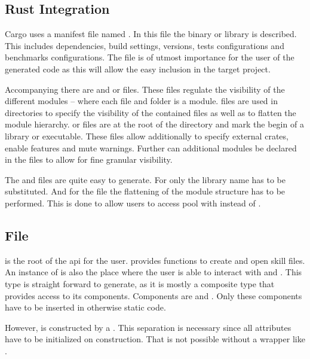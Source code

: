 \documentclass[thesis]{subfiles}
\begin{document}
  \subsection{Rust Integration}
    Cargo uses a manifest file named .
    In this file the binary or library is described.
    This includes dependencies, build settings, versions, tests configurations and benchmarks configurations.
    The file is of utmost importance for the user of the generated code as this will allow the easy inclusion in the target project.%
    ~\autocite[The Manifest Format]{rust-cargo}

    Accompanying there are  and  or  files.
    These files regulate the visibility of the different modules -- where each file and folder is a module.
     files are used in directories to specify the visibility of the contained files as well as to flatten the module hierarchy.
     or  files are at the root of the  directory and mark the begin of a library or executable.
    These files allow additionally to specify external crates, enable features and mute warnings.
    Further can additional modules be declared in the files to allow for fine granular visibility.%
    ~\autocite[7. Modules]{rust-book}

    The  and  files are quite easy to generate.
    For  only the library name has to be substituted.
    And for the  file the flattening of the module structure has to be performed.
    This is done to allow users to access \Foos pool with  instead of .

  \subsection{ File}
    \SkillFile is the root of the \gls{api} for the user.
    \SkillFile provides functions to create and open \gls{skill} files.
    An instance of \SkillFile is also the place where the user is able to interact with \UserTypePools and \StringPool.
    This type is straight forward to generate, as it is mostly a composite type that provides access to its components.
    Components are \UserTypePools and \StringPool.
    Only these components have to be inserted in otherwise static code.

    However, \SkillFile is constructed by a \SkillFileBuilder.
    This separation is necessary since all attributes have to be initialized on construction.
    That is not possible without a wrapper like \OptionT.
\end{document}
